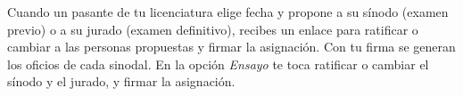 \documentclass[11pt,a4paper]{article}
\begin{document}
{\small\tableofcontents}
\newpage
\begin{quevasahacer}
Cuando un pasante de tu licenciatura elige fecha y propone a su sínodo (examen previo) o a su jurado (examen definitivo), recibes un enlace para ratificar o cambiar a las personas propuestas y firmar la asignación. Con tu firma se generan los oficios de cada sinodal. En la opción \emph{Ensayo} te toca ratificar o cambiar el sínodo y el jurado, y firmar la asignación.
\end{quevasahacer}



\end{document}
